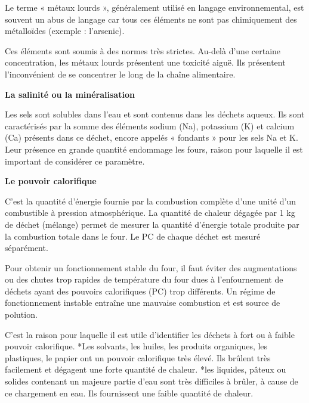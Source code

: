 Le terme « métaux lourds », généralement utilisé en langage environnemental, est souvent un abus de langage car tous ces éléments ne sont pas chimiquement des métalloïdes (exemple : l’arsenic).
\vspace{0.3cm}

Ces éléments sont soumis à des normes très strictes.
Au-delà d’une certaine concentration, les métaux lourds présentent une toxicité aiguë. Ils présentent l’inconvénient de se concentrer le long de la chaîne alimentaire.

\vspace{0.3cm}

\textbf{La salinité ou la minéralisation}
\vspace{0.3cm}

Les sels sont solubles dans l’eau et sont contenus dans les déchets aqueux. Ils sont caractérisés par la somme des éléments sodium (Na), potassium (K) et calcium (Ca) présents dans ce déchet, encore appelés « fondants » pour les sels Na et K. Leur présence en grande quantité endommage les fours, raison pour laquelle il est important de considérer ce paramètre.
\vspace{0.3cm}

\textbf{Le pouvoir calorifique}
\vspace{0.3cm}

C’est la quantité d’énergie fournie par la combustion complète d’une unité d’un combustible à pression atmosphérique.
La quantité de chaleur dégagée par 1 kg de déchet (mélange) permet de mesurer la quantité d’énergie totale produite par la combustion totale dans le four. Le PC de chaque déchet est mesuré séparément.

\vspace{0.3cm}

Pour obtenir un fonctionnement stable du four, il faut éviter des augmentations ou des chutes trop rapides de température du four dues à l’enfournement de déchets ayant des pouvoirs calorifiques (PC) trop différents.
Un régime de fonctionnement instable entraîne une mauvaise combustion et est source de polution.
\vspace{0.3cm}

C’est la raison pour laquelle il est utile d’identifier les déchets à fort ou à faible pouvoir calorifique.
*Les solvants, les huiles, les produits organiques, les plastiques, le papier ont un pouvoir calorifique très élevé. Ils brûlent très facilement et dégagent une forte quantité de chaleur.
*les liquides, pâteux ou solides contenant un majeure partie d’eau sont très difficiles à brûler, à cause de ce chargement en eau. Ils fournissent une faible quantité de chaleur.
\vspace{0.3cm}

